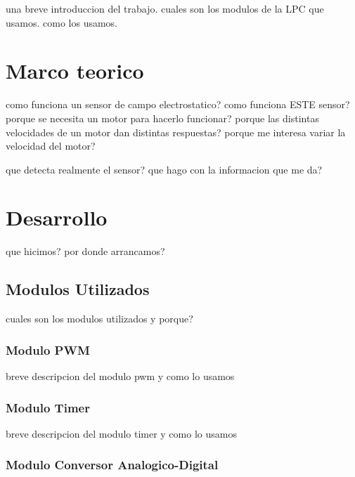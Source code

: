 \documentclass[a4paper]{article}
\begin{document}
una breve introduccion del trabajo. cuales son los modulos de la LPC que usamos. como los usamos. 


\section{Marco teorico} %
\label{sec:marco_teorico}

como funciona un sensor de campo electrostatico? como funciona ESTE sensor? porque se necesita un motor para hacerlo funcionar? porque las distintas velocidades de un motor dan distintas respuestas? porque me interesa variar la velocidad del motor? 

que detecta realmente el sensor? que hago con la informacion que me da?


\section{Desarrollo} %
\label{sec:desarrollo}

que hicimos? por donde arrancamos?


\subsection{Modulos Utilizados} %
\label{sub:modulos_utilizados}

cuales son los modulos utilizados y porque? 

\subsubsection{Modulo PWM} %
\label{ssub:modulo_pwm}

breve descripcion del modulo pwm y como lo usamos


\subsubsection{Modulo Timer} %
\label{ssub:modulo_timer}

breve descripcion del modulo timer y como lo usamos


\subsubsection{Modulo Conversor Analogico-Digital} %
\label{ssub:modulo_conversor_analogico_digital}
\end{document}
